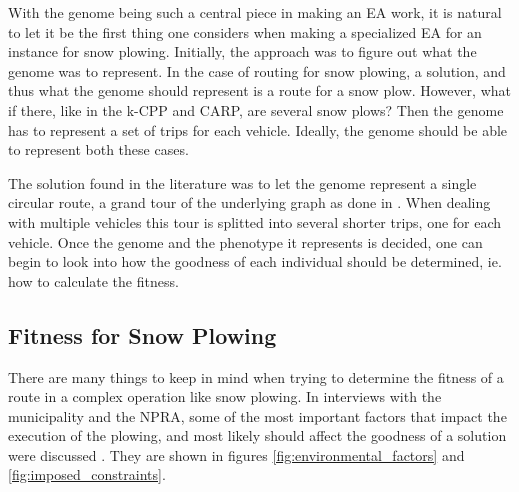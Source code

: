 With the genome being such a central piece in making an EA work, it is natural to let it be the first thing one considers when making a specialized EA for an instance for snow plowing. Initially, the approach was to figure out what the genome was to represent. In the case of routing for snow plowing, a solution, and thus what the genome should represent is a route for a snow plow. However, what if there, like in the k-CPP and CARP, are several snow plows? Then the genome has to represent a set of trips for each vehicle. Ideally, the genome should be able to represent both these cases.

The solution found in the literature was to let the genome represent a single circular route, a grand tour of the underlying graph as done in \citet{lacomme2001GA}. When dealing with multiple vehicles this tour is splitted into several shorter trips, one for each vehicle. Once the genome and the phenotype it represents is decided, one can begin to look into how the goodness of each individual should be determined, ie. how to calculate the fitness.



\subsection{Fitness for Snow Plowing} %
\label{sub:fitness_for_snow_plowing}

There are many things to keep in mind when trying to determine the fitness of a route in a complex operation like snow plowing. In interviews with the municipality and the NPRA, some of the most important factors that impact the execution of the plowing, and most likely should affect the goodness of a solution were discussed \citep{meetingBigOneInTheFall}. They are shown in figures \ref{fig:environmental_factors} and \ref{fig:imposed_constraints}.


